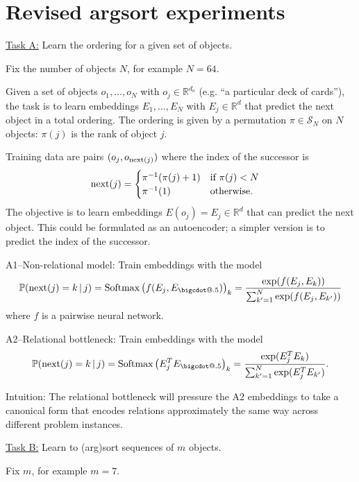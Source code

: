 \documentclass[12pt,pdftex,noinfoline]{imsart}
\makeatletter
\newcommand*\bigcdot{\mathpalette\bigcdot@{.5}}
\newcommand*\bigcdot@[2]{\mathbin{\vcenter{\hbox{\scalebox{#2}{$\m@th#1\bullet$}}}}}
\def\given{\,|\,}
\def\P{\mathbb{P}}
\def\reals{\mathbb{R}}
\def\softmax#1{\mbox{Softmax}\left(#1\right)}
\def\S{{\mathcal{S}}}
\def\next#1{{\text{\rm next}(#1)}}
\makeatother
\begin{document}
\section*{Revised argsort experiments}

\underline{Task A:} Learn the ordering for a given set of objects.

Fix the number of objects $N$, for example $N=64$.

Given a set of objects $o_1, \ldots, o_{N}$ with $o_j\in\reals^{d_o}$ (e.g. ``a particular deck of cards''), 
the task is to learn embeddings $E_1,\ldots, E_{N}$ with $E_j\in\reals^d$ that predict the next object in a total ordering. The ordering is given by a permutation $\pi \in \S_{N}$ on $N$ objects: $\pi(j)$ is the rank of object $j$.

Training data are pairs $(o_j, o_\next{j})$ where the index of the successor is 
\begin{align}
    \next{j} &= \begin{cases}
        \pi^{-1}(\pi(j)+1) & \text{if $\pi(j)<N$}\\
        \pi^{-1}(1) & \text{otherwise}.
    \end{cases}
\end{align}
The objective is to learn embeddings 
$E(o_j) = E_j\in\reals^d$ that can predict the next object. This could be formulated as an autoencoder; a simpler 
version is to predict the index of the successor.

A1--Non-relational model: Train embeddings with the model 
\begin{equation}
    \P(\next{j}=k \given j) = \softmax{f(E_j, E_{\bigcdot})}_k = \frac{\exp(f(E_j, E_k))}{\sum_{k'=1}^N \exp(f(E_j, E_{k'}))}
\end{equation}
where $f$ is a pairwise neural network.

A2--Relational bottleneck: Train embeddings with the model
\begin{equation}
 \P(\next{j}=k \given j) = \softmax{E_j^T E_{\bigcdot}}_k = \frac{\exp(E_j^T E_k)}{\sum_{k'=1}^N \exp(E_j^T E_{k'})}.
\end{equation}


Intuition: The relational bottleneck will pressure the A2 embeddings to take a canonical form that  
encodes relations approximately the same way across different problem instances.


\vskip10pt
\underline{Task B:} Learn to (arg)sort sequences of $m$ objects.

Fix $m$, for example $m=7$. 
\end{document}
